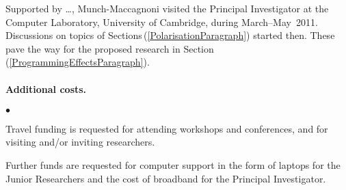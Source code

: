 \documentclass[11pt,twocolumn]{article}
\newenvironment{myitemize}
  {\begin{list}{$\bullet$}
  {\setlength{\topsep}{2pt}
   \setlength{\partopsep}{2pt}
   \setlength{\itemsep}{2.5pt}
   \setlength{\parsep}{2.5pt}
   \setlength{\leftmargin}{1em}
   \setlength{\labelwidth}{.5em}}}
  {\end{list}}
\newcommand{\hidefootnote}[2]{}
\newcommand{\pref}[1]{\,(\ref{#1})}
\newcommand{\Eg}{\emph{Eg.}}
\begin{document}
Supported by \ldots, Munch-Maccagnoni visited the Principal Investigator at
the Computer Laboratory, University of Cambridge, during March--May~2011.
Discussions on topics of Sections\pref{PolarisationParagraph} started then.
These pave the way for the proposed research in
Section\pref{ProgrammingEffectsParagraph}.


\paragraph*{Additional costs.}

\begin{myitemize}
\item
Travel funding is requested for attending workshops and 
conferences, \hidefootnote{\Eg~CALCO, CIE, CSL, CT, ICALP, ICFP, LICS, MFPS,
  POPL, PPDP, PSSL, RTA, TLCA, TYPES, WOLLIC.}, 
and for visiting and/or inviting researchers. \hidefootnote{\Eg~Aarhus
  (A\,Kock); 
  Bamberg (Mendler);
  Barcelona (J\,Kock);
  Bath (Power); 
  Berkeley (D\,Scott); 
  Birmingham (Escard\'o, Levy); 
  Bologna (Asperti, Dal Lago);
  Buffalo (Lawvere);
  Copenhagen (Birkedal, Filinski); 
  Darmstadt (Streicher); 
  Dublin (Dotsenko);
  Edinburgh (Leinster, Plotkin, A\,Simpson); 
  Genova (Moggi, Rosolini); 
  G\"oteborg (Coquand, Dybjer);
  Gunma (Hamana);
  Ljubljana (Bauer, Pretnar);
  London (Oliva);
  Manchester (Aczel);
  Marseille (Girard, Lafont, Regnier); 
  Montreal (Joyal, Makkai, Panangaden);
  Munich (Abel, Hofmann);
  Nice (C\,Simpson, Vallette);
  Nijmegen (Moerdijk);
  Nottingham (Altenkirch);
  Ottawa (P\,Scott); 
  Oxford (Abramsky, Coecke, Doring); 
  Paris (Burroni, Curien, Herbelin, Krivine, Melli\`es, Metayer);
  Philadelphia (Freyd, Pierce, Weirich);
  Pittsburgh (Avigad, Awodey, Harper, Pfenning, Reynolds);
  Portland (Sheard);
  Princeton (Warren);
  Strathclyde (Ghani, McBride);
  Swansea (Beckmann, Berger);
  Sydney (Garner, Lack, Street);
  Warsaw (Zawadowski).}.
\item
Further funds are requested for computer support in the form of laptops
for the Junior Researchers and the cost of broadband for the Principal
Investigator.
\end{myitemize}
\end{document}
